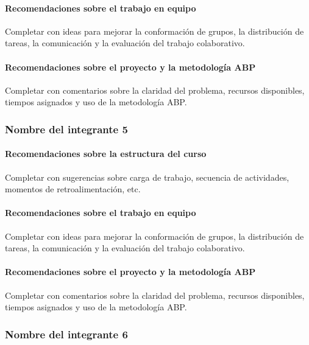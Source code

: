 \documentclass[11pt,a4paper]{article}
\begin{document}
\paragraph{Recomendaciones sobre el trabajo en equipo}
Completar con ideas para mejorar la conformación de grupos, la distribución
de tareas, la comunicación y la evaluación del trabajo colaborativo.

\paragraph{Recomendaciones sobre el proyecto y la metodología ABP}
Completar con comentarios sobre la claridad del problema, recursos
disponibles, tiempos asignados y uso de la metodología ABP.

\subsubsection*{Nombre del integrante 5}

\paragraph{Recomendaciones sobre la estructura del curso}
Completar con sugerencias sobre carga de trabajo, secuencia de actividades,
momentos de retroalimentación, etc.

\paragraph{Recomendaciones sobre el trabajo en equipo}
Completar con ideas para mejorar la conformación de grupos, la distribución
de tareas, la comunicación y la evaluación del trabajo colaborativo.

\paragraph{Recomendaciones sobre el proyecto y la metodología ABP}
Completar con comentarios sobre la claridad del problema, recursos
disponibles, tiempos asignados y uso de la metodología ABP.

\subsubsection*{Nombre del integrante 6}
\end{document}

